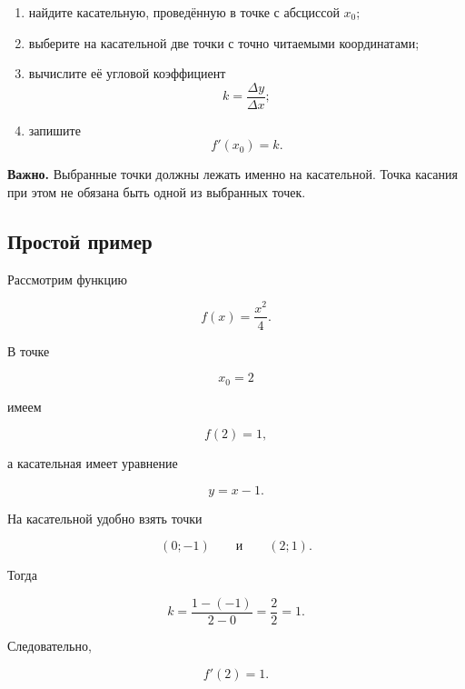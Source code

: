 \documentclass[a4paper,12pt]{article}
\begin{document}
\begin{enumerate}
  \item
  найдите касательную, проведённую в точке с абсциссой \(x_0\);

  \item
  выберите на касательной две точки с точно читаемыми координатами;

  \item
  вычислите её угловой коэффициент
  \[
  k=
  \frac{\Delta y}{\Delta x};
  \]

  \item
  запишите
  \[
  f'(x_0)=k.
  \]
\end{enumerate}

\textbf{Важно.}
Выбранные точки должны лежать именно на касательной.
Точка касания при этом не обязана быть одной из выбранных точек.

\subsection*{Простой пример}

Рассмотрим функцию

\[
f(x)=\frac{x^2}{4}.
\]

В точке

\[
x_0=2
\]

имеем

\[
f(2)=1,
\]

а касательная имеет уравнение

\[
y=x-1.
\]

На касательной удобно взять точки

\[
(0;-1)
\qquad\text{и}\qquad
(2;1).
\]

Тогда

\[
k=
\frac{1-(-1)}{2-0}
=
\frac22
=
1.
\]

Следовательно,

\[
\boxed{f'(2)=1}.
\]
\end{document}

